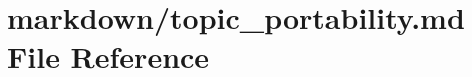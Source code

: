 \hypertarget{topic__portability_8md}{}\section{markdown/topic\+\_\+portability.md File Reference}
\label{topic__portability_8md}
